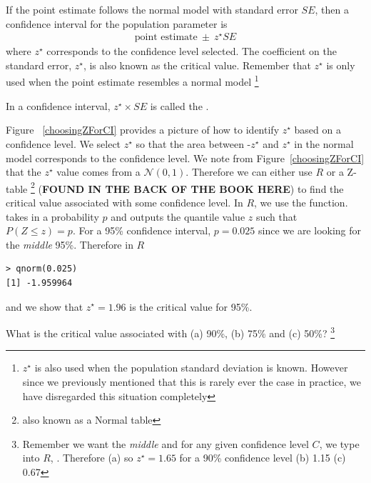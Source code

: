\begin{termBox}{
If the point estimate follows the normal model with standard error $SE$, then a confidence interval for the population parameter is
\begin{eqnarray*}
\text{point estimate}\ \pm\ z^{\star} SE
\end{eqnarray*}
where $z^{\star}$ corresponds to the confidence level selected. The coefficient on the standard error, $z^{\star}$, is also known as the critical value. Remember that $z^{\star}$ is only used when the point estimate resembles a normal model \footnote{$z^{\star}$ is also used when the population standard deviation is known. However since we previously mentioned that this is rarely ever the case in practice, we have disregarded this situation completely}}
\end{termBox}
\begin{termBox}{
\label{marginOfErrorTermBox}In a confidence interval, $z^{\star}\times SE$ is called the .}
\end{termBox}

Figure ~\ref{choosingZForCI} provides a picture of how to identify $z^{\star}$ based on a confidence level. We select $z^{\star}$ so that the area between -$z^{\star}$ and $z^{\star}$ in the normal model corresponds to the confidence level. We note from Figure~\ref{choosingZForCI} that the $z^{\star}$ value comes from a $\mathcal{N}(0,1)$. Therefore we can either use $R$ or a Z-table \footnote{also known as a Normal table} (\textbf{FOUND IN THE BACK OF THE BOOK HERE}) to find the critical value associated with some confidence level. In $R$, we use the  function.  takes in a probability $p$ and outputs the quantile value $z$ such that $P(Z\leq z)=p$. For a 95\% confidence interval, $p=0.025$ since we are looking for the \emph{middle} 95\%. Therefore in $R$\begin{verbatim}
> qnorm(0.025)
[1] -1.959964
\end{verbatim}
and we show that $z^{\star}=1.96$ is the critical value for 95\%. 
\begin{exercise} 
What is the critical value associated with (a) 90\%, (b) 75\% and (c) 50\%? \footnote{Remember we want the \emph{middle} and for any given confidence level $C$, we type into $R$, . Therefore (a)  so $z^{\star}=1.65$ for a 90\% confidence level (b) 1.15 (c) 0.67}
\end{exercise}

